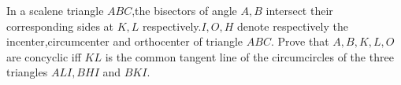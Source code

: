 In a scalene triangle $ABC$,the bisectors of angle $A,B$ intersect their corresponding sides at $K,L$ respectively.$I,O,H$ denote respectively the incenter,circumcenter and orthocenter of triangle $ABC$. Prove that $A,B,K,L,O$ are concyclic iff $KL$ is the common tangent line of the circumcircles of the three triangles $ALI,BHI$ and $BKI$.